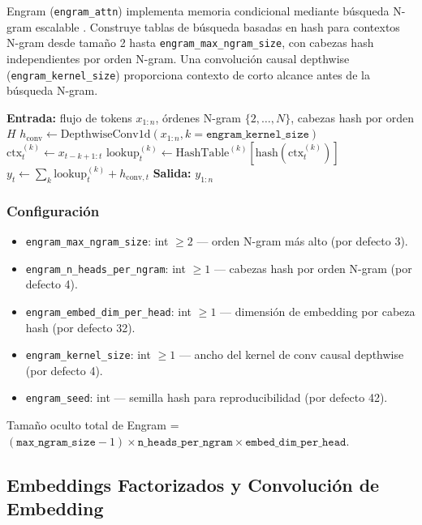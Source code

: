 Engram (\texttt{engram\_attn}) implementa memoria condicional mediante búsqueda N-gram escalable \citep{cheng2026conditionalmemoryscalablelookup}. Construye tablas de búsqueda basadas en hash para contextos N-gram desde tamaño 2 hasta \texttt{engram\_max\_ngram\_size}, con cabezas hash independientes por orden N-gram. Una convolución causal depthwise (\texttt{engram\_kernel\_size}) proporciona contexto de corto alcance antes de la búsqueda N-gram.

\begin{algorithmic}[1]
\State \textbf{Entrada:} flujo de tokens $x_{1:n}$, órdenes N-gram $\{2, \ldots, N\}$, cabezas hash por orden $H$
\State $h_{\text{conv}} \gets \text{DepthwiseConv1d}(x_{1:n}, k=\texttt{engram\_kernel\_size})$ 
    \State $\text{ctx}_t^{(k)} \gets x_{t-k+1:t}$ 
    \State $\text{lookup}^{(k)}_t \gets \text{HashTable}^{(k)}[\text{hash}(\text{ctx}_t^{(k)})]$ 
\EndFor
\State $y_t \gets \sum_{k} \text{lookup}^{(k)}_t + h_{\text{conv},t}$ 
\State \textbf{Salida:} $y_{1:n}$
\end{algorithmic}

\subsubsection{Configuración}
\begin{itemize}[leftmargin=*]
    \item \texttt{engram\_max\_ngram\_size}: int $\ge 2$ --- orden N-gram más alto (por defecto 3).
    \item \texttt{engram\_n\_heads\_per\_ngram}: int $\ge 1$ --- cabezas hash por orden N-gram (por defecto 4).
    \item \texttt{engram\_embed\_dim\_per\_head}: int $\ge 1$ --- dimensión de embedding por cabeza hash (por defecto 32).
    \item \texttt{engram\_kernel\_size}: int $\ge 1$ --- ancho del kernel de conv causal depthwise (por defecto 4).
    \item \texttt{engram\_seed}: int --- semilla hash para reproducibilidad (por defecto 42).
\end{itemize}
Tamaño oculto total de Engram = $(\texttt{max\_ngram\_size} - 1) \times \texttt{n\_heads\_per\_ngram} \times \texttt{embed\_dim\_per\_head}$.

\subsection{Embeddings Factorizados y Convolución de Embedding}

